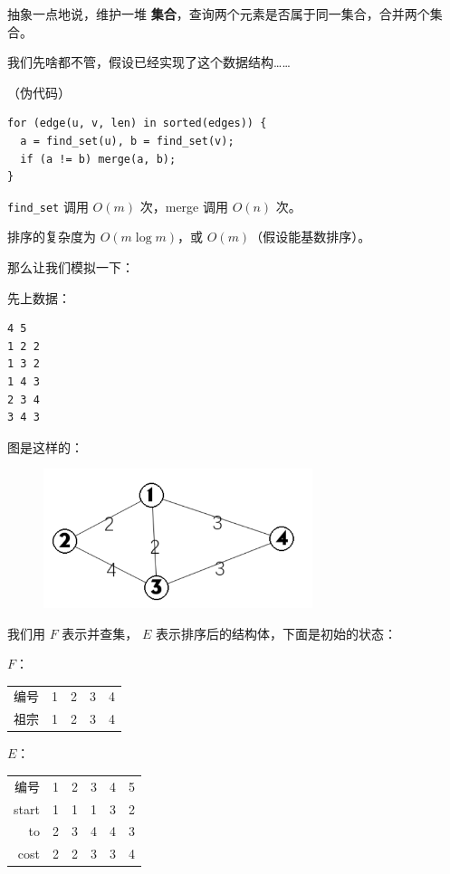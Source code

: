 抽象一点地说，维护一堆 \textbf{集合}，查询两个元素是否属于同一集合，合并两个集合。

我们先啥都不管，假设已经实现了这个数据结构……

（伪代码）

\begin{verbatim}
for (edge(u, v, len) in sorted(edges)) {
  a = find_set(u), b = find_set(v);
  if (a != b) merge(a, b);
}
\end{verbatim}

\texttt{find\_set} 调用 $O(m)$ 次，merge 调用 $O(n)$ 次。

排序的复杂度为 $O(m \log m)$，或 $O(m)$（假设能基数排序）。

那么让我们模拟一下：

先上数据：

\begin{verbatim}
4 5
1 2 2
1 3 2
1 4 3
2 3 4
3 4 3
\end{verbatim}

图是这样的：

\begin{figure}[htbp]
\centering
\includegraphics[width=0.7\textwidth]{docs/graph/images/mst1.png} 

\end{figure}

我们用 $F$ 表示并查集， $E$ 表示排序后的结构体，下面是初始的状态：

$F$：

\begin{tabular}{rrrrr}
\hline
编号& 1& 2& 3& 4\\祖宗& 1& 2& 3& 4\\\hline
\end{tabular}

$E$：

\begin{tabular}{rrrrrr}
\hline
编号& 1& 2& 3& 4& 5\\start& 1& 1& 1& 3& 2\\to& 2& 3& 4& 4& 3\\cost& 2& 2& 3& 3& 4\\\hline
\end{tabular}

